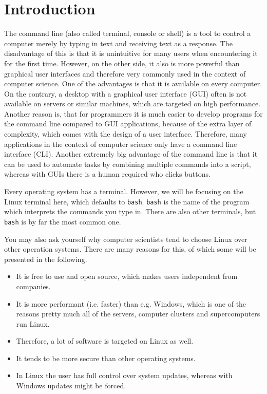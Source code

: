 \section{Introduction}

The command line (also called terminal, console or shell) is a tool to control a computer merely by typing in text and receiving text as a response. The disadvantage of this is that it is unintuitive for many users when encountering it for the first time. However, on the other side, it also is more powerful than graphical user interfaces and therefore very commonly used in the context of computer science. One of the advantages is that it is available on every computer. On the contrary, a desktop with a graphical user interface (GUI) often is not available on servers or similar machines, which are targeted on high performance. Another reason is, that for programmers it is much easier to develop programs for the command line compared to GUI applications, because of the extra layer of complexity, which comes with the design of a user interface. Therefore, many applications in the context of computer science only have a command line interface (CLI). Another extremely big advantage of the command line is that it can be used to automate tasks by combining multiple commands into a script, whereas with GUIs there is a human required who clicks buttons.

Every operating system has a terminal. However, we will be focusing on the Linux terminal here, which defaults to \lstinline{bash}. \lstinline{bash} is the name of the program which interprets the commands you type in. There are also other terminals, but \lstinline{bash} is by far the most common one.

You may also ask yourself why computer scientists tend to choose Linux over other operation systems. There are many reasons for this, of which some will be presented in the following.

\begin{itemize}
    \item It is free to use and open source, which makes users independent from companies.
    \item It is more performant (i.e. faster) than e.g. Windows, which is one of the reasons pretty much all of the servers, computer clusters and supercomputers run Linux.
    \item Therefore, a lot of software is targeted on Linux as well.
    \item It tends to be more secure than other operating systems.
    \item In Linux the user has full control over system updates, whereas with Windows updates might be forced.
\end{itemize}

